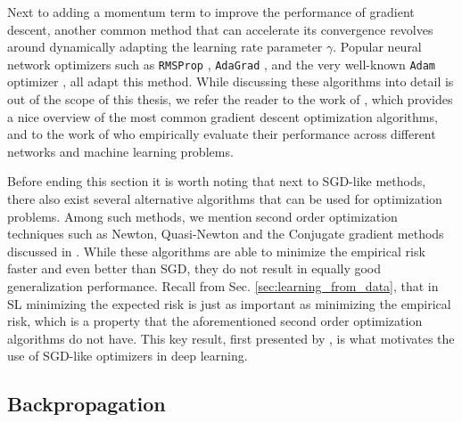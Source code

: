 Next to adding a momentum term to improve the performance of gradient descent, another common method that can accelerate its convergence revolves around dynamically adapting the learning rate parameter $\gamma$. Popular neural network optimizers such as \texttt{RMSProp} \cite{tieleman2012lecture}, \texttt{AdaGrad} \cite{duchi2011adaptive}, and the very well-known \texttt{Adam} optimizer \cite{kingma2014adam}, all adapt this method. While discussing these algorithms into detail is out of the scope of this thesis, we refer the reader to the work of \citet{ruder2016overview}, which provides a nice overview of the most common gradient descent optimization algorithms, and to the work of \citet{schmidt2020descending} who empirically evaluate their performance across different networks and machine learning problems. 

Before ending this section it is worth noting that next to SGD-like methods, there also exist several alternative algorithms that can be used for optimization problems. Among such methods, we mention second order optimization techniques such as Newton, Quasi-Newton and the Conjugate gradient methods discussed in \cite{tan2019review}. While these algorithms are able to minimize the empirical risk faster and even better than SGD, they do not result in equally good generalization performance. Recall from Sec. \ref{sec:learning_from_data}, that in SL minimizing the expected risk is just as important as minimizing the empirical risk, which is a property that the aforementioned second order optimization algorithms do not have. This key result, first presented by \citet{bottou201113}, is what motivates the use of SGD-like optimizers in deep learning.       

\subsection{Backpropagation}
\label{sec:backprop}

